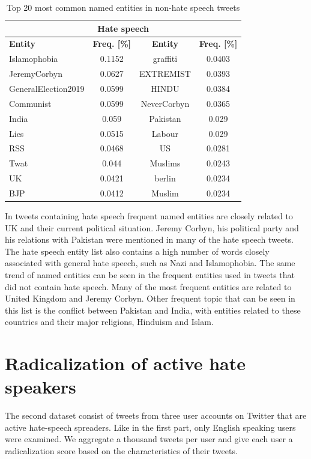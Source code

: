 \documentclass[conference]{IEEEtran}
\begin{document}
\begin{table}[!ht]
  \def\arraystretch{1.2}%
  \begin{center}
    \caption{Top 20 most common named entities in non-hate speech tweets}
    \label{tab:named_entities_non_hate}
    \begin{tabular}{l c | c c}
      \hline\hline
      \multicolumn{4}{c}{\textbf{Hate speech}}\\
      \hline
      \textbf{Entity}&\textbf{Freq. [\%]}&\textbf{Entity}&\textbf{Freq. [\%]}\\
      \hline
      Islamophobia & 0.1152 & graffiti & 0.0403\\
      JeremyCorbyn & 0.0627 & EXTREMIST & 0.0393\\
      GeneralElection2019 & 0.0599 & HINDU & 0.0384\\
      Communist & 0.0599 & NeverCorbyn & 0.0365\\
      India & 0.059 & Pakistan & 0.029\\
      Lies & 0.0515 & Labour & 0.029\\
      RSS & 0.0468 & US & 0.0281\\
      Twat & 0.044 & Muslims & 0.0243\\
      UK & 0.0421 & berlin & 0.0234\\
      BJP & 0.0412 & Muslim & 0.0234\\                          
      \hline\hline
    \end{tabular}  
  \end{center}
\end{table}

In tweets containing hate speech frequent named entities are closely related to UK and their 
current political situation. Jeremy Corbyn, his political party and his relations with 
Pakistan were mentioned in many of the hate speech tweets.
The hate speech entity list also contains a high number of words closely associated with 
general hate speech, such as Nazi and Islamophobia. The same trend of named entities can 
be seen in the frequent entities used in tweets that did not contain hate speech. 
Many of the most frequent entities are related to United Kingdom and Jeremy Corbyn. 
Other frequent topic that can be seen in this list is the conflict between Pakistan and 
India, with entities related to these countries and their major religions, Hinduism and Islam.

\section{Radicalization of active hate speakers}
The second dataset consist of tweets from three user accounts on Twitter that are active hate-speech spreaders. Like in the first part, only English speaking users were examined.
We aggregate a thousand tweets per user and give each user a radicalization score based on the characteristics of their tweets.
\end{document}
